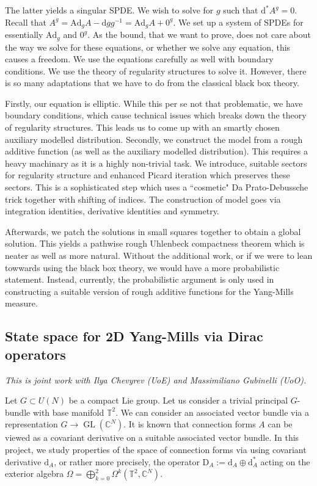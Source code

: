 \documentclass[11pt]{article}
\numberwithin{equation}{section}
\theoremstyle{definition}
\theoremstyle{remark}
\newcommand{\Ad}{\mathrm{Ad}}
\newcommand{\diff}{\mathrm{d}}
\newcommand{\1}{\mathbf 1}
\newcommand{\<}{\langle}
\renewcommand{\>}{\rangle}
\newcommand{\bT}{\mathbb T}
\begin{document}
The latter yields a singular SPDE. We wish to solve for $g$ such that $\diff^*A^g=0$. Recall that $A^g=\Ad_gA-\diff gg^{-1}=\Ad_gA+0^g$. We set up a system of SPDEs for essentially $\Ad_g$ and $0^g$. As the bound, that we want to prove, does not care about the way we solve for these equations, or whether we solve any equation, this causes a freedom. We use the equations carefully as well with boundary conditions. We use the theory of regularity structures to solve it. However, there is so many adaptations that we have to do from the classical black box theory. 


Firstly, our equation is elliptic. While this per se not that problematic, we have boundary conditions, which cause technical issues which breaks down the theory of regularity structures. This leads us to come up with an smartly chosen auxiliary modelled distribution.  Secondly, we construct the model from a rough additive function (as well as the auxiliary modelled distribution). This requires a heavy machinary as it is a highly non-trivial task. We introduce, suitable sectors for regularity structure and enhanced Picard iteration which preserves these sectors. This is a sophisticated step which uses a ``cosmetic" Da Prato-Debussche trick together with shifting of indices.   The construction of model goes via integration identities, derivative identities and symmetry.  

Afterwards, we patch the solutions in small squares together to obtain a global solution. This yields a pathwise rough Uhlenbeck compactness theorem which is neater as well as more natural. Without the additional work, or if we were to lean towwards using the black box theory, we would have a more probabilistic statement. Instead, currently, the probabilistic argument  is only used in constructing a suitable version of rough additive functions for the Yang-Mills measure. 
%




\subsection{State space for 2D Yang-Mills via Dirac operators}\label{sec:Dirac_2D}
%
\textit{This is joint work with Ilya Chevyrev (UoE) and Massimiliano Gubinelli (UoO).} 

\medskip 

\noindent Let $G\subset U(N)$ be a compact Lie group. Let us consider a trivial principal $G$-bundle with base manifold $\bT^2$. We can consider an associated vector bundle via a representation $G\to \operatorname{GL}(\mathbb C^N)$. It is known that connection forms $A$ can be viewed as a covariant derivative on a suitable associated vector bundle. In this project, we study properties of the space of connection forms via using covariant derivative $\diff_A$, or rather more precisely, the operator  $\mathrm{D}_A:=\diff_A\oplus\diff_A^*$ acting on the exterior algebra $\Omega=\bigoplus_{k=0}^ 2\Omega^k(\bT^2,\mathbb C^N)$. 
\end{document}
